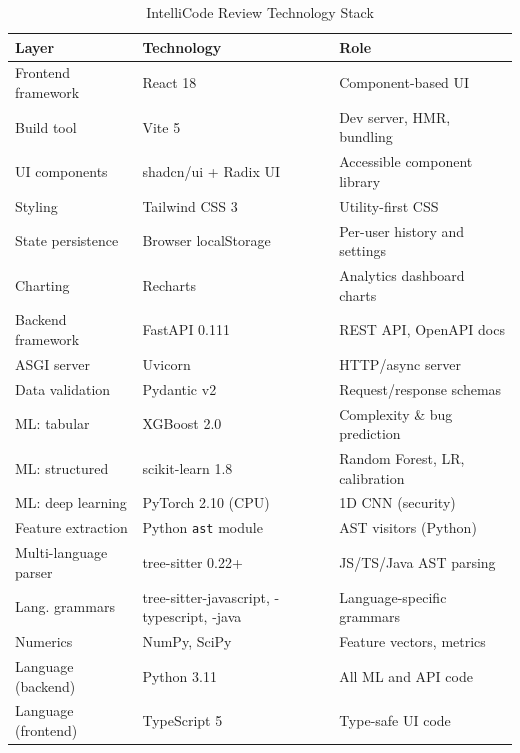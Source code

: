 \documentclass[12pt, oneside]{report}
\begin{document}
\begin{table}[H]
\centering
\caption{IntelliCode Review Technology Stack}
\label{tab:techstack}
\begin{tabular}{@{}lll@{}}
\toprule
\textbf{Layer} & \textbf{Technology} & \textbf{Role} \\
\midrule
Frontend framework    & React 18            & Component-based UI \\
Build tool            & Vite 5              & Dev server, HMR, bundling \\
UI components         & shadcn/ui + Radix UI & Accessible component library \\
Styling               & Tailwind CSS 3      & Utility-first CSS \\
State persistence     & Browser localStorage & Per-user history and settings \\
Charting              & Recharts            & Analytics dashboard charts \\
\midrule
Backend framework     & FastAPI 0.111       & REST API, OpenAPI docs \\
ASGI server           & Uvicorn             & HTTP/async server \\
Data validation       & Pydantic v2         & Request/response schemas \\
\midrule
ML: tabular           & XGBoost 2.0         & Complexity \& bug prediction \\
ML: structured        & scikit-learn 1.8    & Random Forest, LR, calibration \\
ML: deep learning     & PyTorch 2.10 (CPU)  & 1D CNN (security) \\
Feature extraction    & Python \texttt{ast} module & AST visitors (Python) \\
Multi-language parser & tree-sitter 0.22+   & JS/TS/Java AST parsing \\
Lang. grammars        & tree-sitter-javascript, -typescript, -java & Language-specific grammars \\
Numerics              & NumPy, SciPy        & Feature vectors, metrics \\
\midrule
Language (backend)    & Python 3.11         & All ML and API code \\
Language (frontend)   & TypeScript 5        & Type-safe UI code \\
\bottomrule
\end{tabular}
\end{table}

\end{document}
